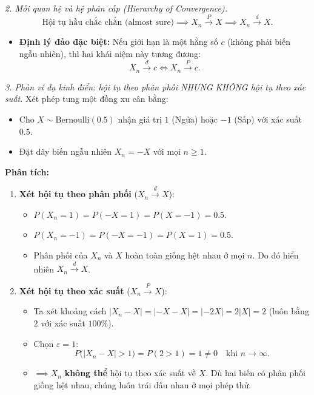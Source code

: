 \textit{2. Mối quan hệ và hệ phân cấp (Hierarchy of Convergence).}
\[ \text{Hội tụ hầu chắc chắn (almost sure)}\implies X_n\xrightarrow{P}X\implies X_n\xrightarrow{d}X. \]
\begin{itemize}
\item \textbf{Định lý đảo đặc biệt:} Nếu giới hạn là một hằng số $c$ (không phải biến ngẫu nhiên), thì hai khái niệm này tương đương:
\[ X_n\xrightarrow{d}c \iff X_n\xrightarrow{P}c. \]
\end{itemize}

\textit{3. Phản ví dụ kinh điển: hội tụ theo phân phối NHƯNG KHÔNG hội tụ theo xác suất.} Xét phép tung một đồng xu cân bằng:
\begin{itemize}
\item Cho $X\sim\mathrm{Bernoulli}(0.5)$ nhận giá trị $1$ (Ngửa) hoặc $-1$ (Sấp) với xác suất $0.5$.
\item Đặt dãy biến ngẫu nhiên $X_n=-X$ với mọi $n\ge 1$.
\end{itemize}
\textbf{Phân tích:}
\begin{enumerate}
\item \textbf{Xét hội tụ theo phân phối} ($X_n\xrightarrow{d}X$):
  \begin{itemize}
  \item $P(X_n=1)=P(-X=1)=P(X=-1)=0.5$.
  \item $P(X_n=-1)=P(-X=-1)=P(X=1)=0.5$.
  \item Phân phối của $X_n$ và $X$ hoàn toàn giống hệt nhau ở mọi $n$. Do đó hiển nhiên $X_n\xrightarrow{d}X$.
  \end{itemize}
\item \textbf{Xét hội tụ theo xác suất} ($X_n\xrightarrow{P}X$):
  \begin{itemize}
  \item Ta xét khoảng cách $|X_n-X|=|-X-X|=|-2X|=2|X|=2$ (luôn bằng $2$ với xác suất $100\%$).
  \item Chọn $\varepsilon=1$:
  \[ P\big(|X_n-X|>1\big)=P(2>1)=1\neq 0\quad\text{khi } n\to\infty. \]
  \item $\implies X_n$ \textbf{không thể} hội tụ theo xác suất về $X$. Dù hai biến có phân phối giống hệt nhau, chúng luôn trái dấu nhau ở mọi phép thử.
  \end{itemize}
\end{enumerate}

